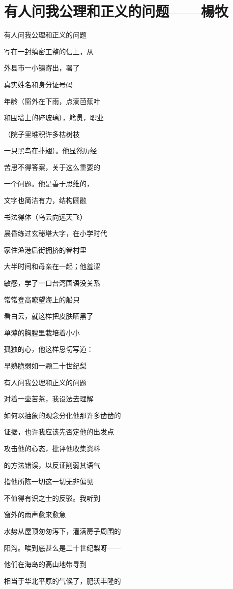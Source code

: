 \section{有人问我公理和正义的问题——楊牧}

有人问我公理和正义的问题

写在一封缜密工整的信上，从

外县市一小镇寄出，署了

真实姓名和身分证号码

年龄（窗外在下雨，点滴芭蕉叶

和围墙上的碎玻璃），籍贯，职业

（院子里堆积许多枯树枝

一只黑鸟在扑翅）。他显然历经

苦思不得答案，关于这么重要的

一个问题。他是善于思维的，

文字也简洁有力，结构圆融

书法得体（乌云向远天飞）

晨昏练过玄秘塔大字，在小学时代

家住渔港后街拥挤的眷村里

大半时间和母亲在一起；他羞涩

敏感，学了一口台湾国语没关系

常常登高瞭望海上的船只

看白云，就这样把皮肤晒黑了

单薄的胸膛里栽培着小小

孤独的心，他这样恳切写道：

早熟脆弱如一颗二十世纪梨



有人问我公理和正义的问题

对着一壶苦茶，我设法去理解

如何以抽象的观念分化他那许多凿凿的

证据，也许我应该先否定他的出发点

攻击他的心态，批评他收集资料

的方法错误，以反证削弱其语气

指他所陈一切这一切无非偏见

不值得有识之士的反驳。我听到

窗外的雨声愈来愈急

水势从屋顶匆匆泻下，灌满房子周围的

阳沟。唉到底甚么是二十世纪梨呀——

他们在海岛的高山地带寻到

相当于华北平原的气候了，肥沃丰隆的

